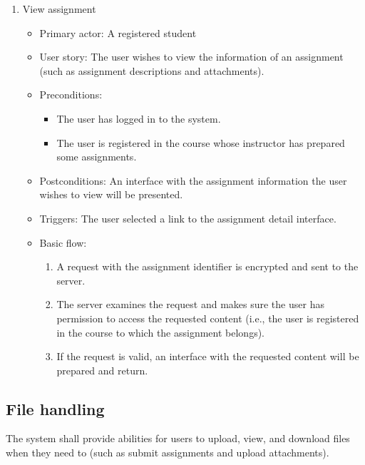 \begin{enumerate}
\item View assignment
\begin{itemize}
    \item Primary actor: A registered student
    \item User story: The user wishes to view the information of an assignment
     (such as assignment descriptions and attachments).
    \item Preconditions:
        \begin{itemize}
            \item The user has logged in to the system.
            \item The user is registered in the course whose instructor has
                prepared some assignments.
        \end{itemize}
    \item Postconditions: An interface with the assignment information the user
        wishes to view will be presented.
    \item Triggers: The user selected a link to the assignment detail interface.
    \item Basic flow:
        \begin{enumerate}
            \item A request with the assignment identifier is encrypted and
                sent to the server.
            \item The server examines the request and makes sure the user has
                permission to access the requested content (i.e., the user is
                registered in the course to which the assignment belongs).
            \item If the request is valid, an interface with the requested
                content will be prepared and return.
        \end{enumerate}
\end{itemize}
\end{enumerate}

\subsection{File handling}
The system shall provide abilities for users to upload, view, and download
files when they need to (such as submit assignments and upload attachments).

